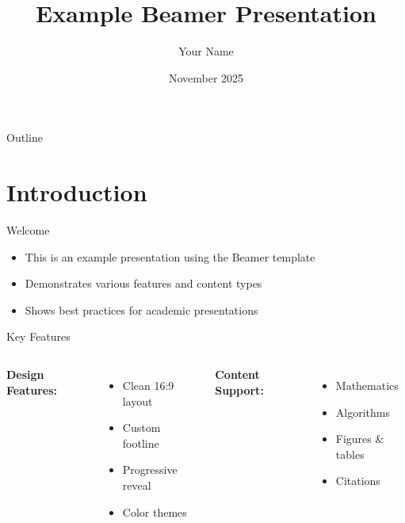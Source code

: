 \documentclass[aspectratio=169, dvipsnames]{beamer}
\title{Example Beamer Presentation}
\author{Your Name}
\date{November 2025}
\begin{document}
\begin{frame}
    \titlepage
\end{frame}

\begin{frame}{Outline}
    \tableofcontents
\end{frame}


\section{Introduction}

\begin{frame}{Welcome}
    \begin{itemize}
        \item This is an example presentation using the Beamer template
        \pause
        \item Demonstrates various features and content types
        \pause
        \item Shows best practices for academic presentations
    \end{itemize}
\end{frame}

\begin{frame}{Key Features}
    \begin{columns}
        \textbf{Design Features:}
        \begin{itemize}
            \item Clean 16:9 layout
            \item Custom footline
            \item Progressive reveal
            \item Color themes
        \end{itemize}
        
        \textbf{Content Support:}
        \begin{itemize}
            \item Mathematics
            \item Algorithms
            \item Figures \& tables
            \item Citations
        \end{itemize}
    \end{columns}
\end{frame}

\end{document}

